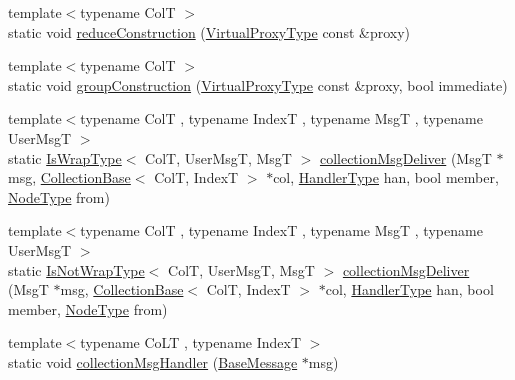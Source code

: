 \begin{DoxyCompactItemize}
\item 
{\footnotesize template$<$typename ColT $>$ }\\static void \hyperlink{structvt_1_1vrt_1_1collection_1_1_collection_manager_a387f6106adb3d0accd039ee4ff50a515}{reduce\+Construction} (\hyperlink{namespacevt_a1b417dd5d684f045bb58a0ede70045ac}{Virtual\+Proxy\+Type} const \&proxy)
\item 
{\footnotesize template$<$typename ColT $>$ }\\static void \hyperlink{structvt_1_1vrt_1_1collection_1_1_collection_manager_a3512b8e7d8bac218f28e7ffef611e5fa}{group\+Construction} (\hyperlink{namespacevt_a1b417dd5d684f045bb58a0ede70045ac}{Virtual\+Proxy\+Type} const \&proxy, bool immediate)
\item 
{\footnotesize template$<$typename ColT , typename IndexT , typename MsgT , typename User\+MsgT $>$ }\\static \hyperlink{structvt_1_1vrt_1_1collection_1_1_collection_manager_a1f91c97ed52237c3a3576dfbbe87c8f8}{Is\+Wrap\+Type}$<$ ColT, User\+MsgT, MsgT $>$ \hyperlink{structvt_1_1vrt_1_1collection_1_1_collection_manager_a8335935e585268654043862f312d9fa0}{collection\+Msg\+Deliver} (MsgT $\ast$msg, \hyperlink{structvt_1_1vrt_1_1collection_1_1_collection_base}{Collection\+Base}$<$ ColT, IndexT $>$ $\ast$col, \hyperlink{namespacevt_af64846b57dfcaf104da3ef6967917573}{Handler\+Type} han, bool member, \hyperlink{namespacevt_a866da9d0efc19c0a1ce79e9e492f47e2}{Node\+Type} from)
\item 
{\footnotesize template$<$typename ColT , typename IndexT , typename MsgT , typename User\+MsgT $>$ }\\static \hyperlink{structvt_1_1vrt_1_1collection_1_1_collection_manager_a18e3a17d9eb086c6c2f499242b7faa1e}{Is\+Not\+Wrap\+Type}$<$ ColT, User\+MsgT, MsgT $>$ \hyperlink{structvt_1_1vrt_1_1collection_1_1_collection_manager_ac92b9519a9c22103746e52375bc18b67}{collection\+Msg\+Deliver} (MsgT $\ast$msg, \hyperlink{structvt_1_1vrt_1_1collection_1_1_collection_base}{Collection\+Base}$<$ ColT, IndexT $>$ $\ast$col, \hyperlink{namespacevt_af64846b57dfcaf104da3ef6967917573}{Handler\+Type} han, bool member, \hyperlink{namespacevt_a866da9d0efc19c0a1ce79e9e492f47e2}{Node\+Type} from)
\item 
{\footnotesize template$<$typename Co\+LT , typename IndexT $>$ }\\static void \hyperlink{structvt_1_1vrt_1_1collection_1_1_collection_manager_a9b2bfe1f74298f0e9b7fdc4888f73e3d}{collection\+Msg\+Handler} (\hyperlink{namespacevt_ac34f95a5e2b8109b55bfba52b074443d}{Base\+Message} $\ast$msg)

\end{DoxyCompactItemize}
